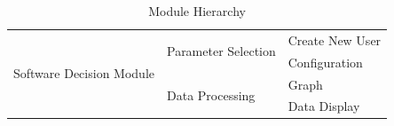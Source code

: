 \documentclass[12pt, titlepage]{article}
\begin{document}
\begin{table}[h!]
\begin{tabular}{|p{} | p{} |p{}  |}
    \midrule

    \multirow{4}{0.3\textwidth}{Software Decision Module} &  \multirow{2}{0.3\textwidth}{Parameter Selection}& Create New User\\
																		&			& Configuration \\
\cline{2-3}
                                                          & \multirow{2}{0.3\textwidth}{Data Processing}       & Graph  \\
											&			& Data Display \\

    \bottomrule
  \end{tabular}
  \caption{Module Hierarchy}
  \label{TblMH}
\end{table}

\newpage

%
%
%
%
%
%
%
%
%
%
%
\end{document}
